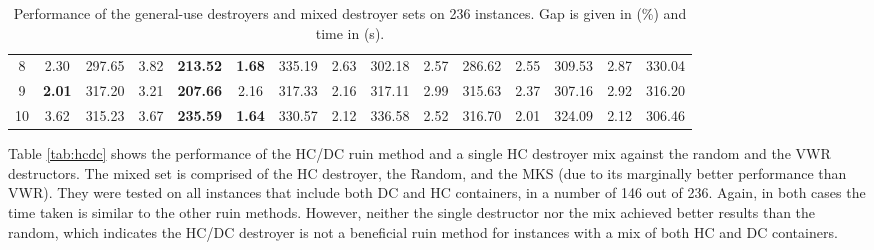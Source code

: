 \documentclass[preprint,12pt,3p]{elsarticle}
\begin{document}
\begin{table}[ht]
{\begin{tabular}{c c c c c c c c c c c c c c c}
    8 & 2.30 & 297.65 & 3.82 & \textbf{213.52} & \textbf{1.68} & 335.19 & 2.63 & 302.18 & 2.57 & 286.62 & 2.55 & 309.53 & 2.87 & 330.04 \\
    9 & \textbf{2.01} & 317.20 & 3.21 & \textbf{207.66} & 2.16 & 317.33 & 2.16 & 317.11 & 2.99 & 315.63 & 2.37 & 307.16 & 2.92 & 316.20 \\
    10 & 3.62 & 315.23 & 3.67 & \textbf{235.59} & \textbf{1.64} & 330.57 & 2.12 & 336.58 & 2.52 & 316.70 & 2.01 & 324.09 & 2.12 & 306.46 \\
    \hline
\end{tabular}
}
\caption[Performance of the general-use destroyers and mixed destroyer sets on 236 instances.]{Performance of the general-use destroyers and mixed destroyer sets on 236 instances. Gap is given in (\%) and time in (s).}
\label{tab:general}
\end{table}

Table \ref{tab:hcdc} shows the performance of the HC/DC ruin method and a single HC destroyer mix against the random and the VWR destructors. The mixed set is comprised of the HC destroyer, the Random, and the MKS (due to its marginally better performance than VWR). They were tested on all instances that include both DC and HC containers, in a number of 146 out of 236. Again, in both cases the time taken is similar to the other ruin methods. However, neither the single destructor nor the mix achieved better results than the random, which indicates the HC/DC destroyer is not a beneficial ruin method for instances with a mix of both HC and DC containers.
\end{document}

